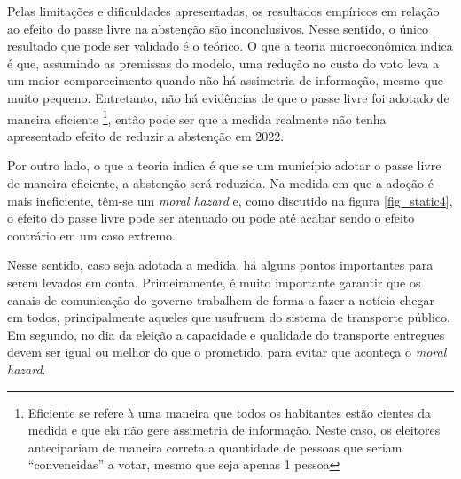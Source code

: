 Pelas limitações e dificuldades apresentadas, os resultados empíricos em relação ao efeito do passe livre na abstenção são inconclusivos. Nesse sentido, o único resultado que pode ser validado é o teórico. O que a teoria microeconômica indica é que, assumindo as premissas do modelo, uma redução no custo do voto leva a um maior comparecimento quando não há assimetria de informação, mesmo que muito pequeno. Entretanto, não há evidências de que o passe livre foi adotado de maneira eficiente \footnote{Eficiente se refere à uma maneira que todos os habitantes estão cientes da medida e que ela não gere assimetria de informação. Neste caso, os eleitores antecipariam de maneira correta a quantidade de pessoas que seriam ``convencidas'' a votar, mesmo que seja apenas 1 pessoa}, então pode ser que a medida realmente não tenha apresentado efeito de reduzir a abstenção em 2022.

Por outro lado, o que a teoria indica é que se um município adotar o passe livre de maneira eficiente, a abstenção será reduzida. Na medida em que a adoção é mais ineficiente, têm-se um \textit{moral hazard} e, como discutido na figura \ref{fig_static4}, o efeito do passe livre pode ser atenuado ou pode até acabar sendo o efeito contrário em um caso extremo. 

Nesse sentido, caso seja adotada a medida, há alguns pontos importantes para serem levados em conta. Primeiramente, é muito importante garantir que os canais de comunicação do governo trabalhem de forma a fazer a notícia chegar em todos, principalmente aqueles que usufruem do sistema de transporte público. Em segundo, no dia da eleição a capacidade e qualidade do transporte entregues devem ser igual ou melhor do que o prometido, para evitar que aconteça o \textit{moral hazard}.